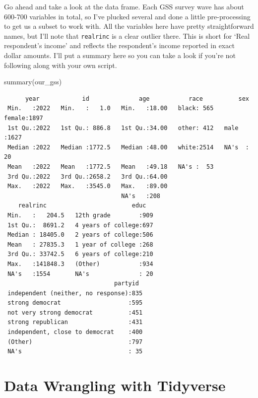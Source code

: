 \documentclass[
  letterpaper,
  DIV=11,
  numbers=noendperiod]{scrreprt}
\newenvironment{Shaded}{\begin{snugshade}}{\end{snugshade}}
\newcommand{\FunctionTok}[1]{\textcolor[rgb]{0.28,0.35,0.67}{#1}}
\newcommand{\NormalTok}[1]{\textcolor[rgb]{0.00,0.23,0.31}{#1}}
\begin{document}
Go ahead and take a look at the data frame. Each GSS survey wave has
about 600-700 variables in total, so I've plucked several and done a
little pre-processing to get us a subset to work with. All the variables
here have pretty straightforward names, but I'll note that
\texttt{realrinc} is a clear outlier there. This is short for `Real
respondent's income' and reflects the respondent's income reported in
exact dollar amounts. I'll put a summary here so you can take a look if
you're not following along with your own script.

\begin{Shaded}
\begin{Highlighting}[]
\FunctionTok{summary}\NormalTok{(our\_gss)}
\end{Highlighting}
\end{Shaded}

\begin{verbatim}
      year            id              age           race          sex      
 Min.   :2022   Min.   :   1.0   Min.   :18.00   black: 565   female:1897  
 1st Qu.:2022   1st Qu.: 886.8   1st Qu.:34.00   other: 412   male  :1627  
 Median :2022   Median :1772.5   Median :48.00   white:2514   NA's  :  20  
 Mean   :2022   Mean   :1772.5   Mean   :49.18   NA's :  53                
 3rd Qu.:2022   3rd Qu.:2658.2   3rd Qu.:64.00                             
 Max.   :2022   Max.   :3545.0   Max.   :89.00                             
                                 NA's   :208                               
    realrinc                        educ    
 Min.   :   204.5   12th grade        :909  
 1st Qu.:  8691.2   4 years of college:697  
 Median : 18405.0   2 years of college:506  
 Mean   : 27835.3   1 year of college :268  
 3rd Qu.: 33742.5   6 years of college:210  
 Max.   :141848.3   (Other)           :934  
 NA's   :1554       NA's              : 20  
                               partyid   
 independent (neither, no response):835  
 strong democrat                   :595  
 not very strong democrat          :451  
 strong republican                 :431  
 independent, close to democrat    :400  
 (Other)                           :797  
 NA's                              : 35  
\end{verbatim}

\section{Data Wrangling with
Tidyverse}\label{data-wrangling-with-tidyverse}
\end{document}
